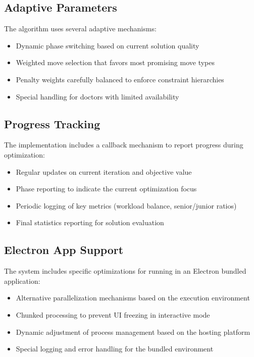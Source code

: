 \documentclass[12pt]{article}
\begin{document}
\subsection{Adaptive Parameters}

The algorithm uses several adaptive mechanisms:
\begin{itemize}
    \item Dynamic phase switching based on current solution quality
    \item Weighted move selection that favors most promising move types
    \item Penalty weights carefully balanced to enforce constraint hierarchies
    \item Special handling for doctors with limited availability
\end{itemize}

\subsection{Progress Tracking}

The implementation includes a callback mechanism to report progress during optimization:
\begin{itemize}
    \item Regular updates on current iteration and objective value
    \item Phase reporting to indicate the current optimization focus
    \item Periodic logging of key metrics (workload balance, senior/junior ratios)
    \item Final statistics reporting for solution evaluation
\end{itemize}

\subsection{Electron App Support}

The system includes specific optimizations for running in an Electron bundled application:
\begin{itemize}
    \item Alternative parallelization mechanisms based on the execution environment
    \item Chunked processing to prevent UI freezing in interactive mode
    \item Dynamic adjustment of process management based on the hosting platform
    \item Special logging and error handling for the bundled environment
\end{itemize}
\end{document}
